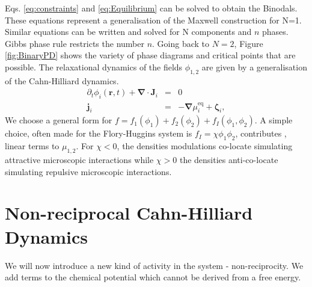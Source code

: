 Eqs. \eqref{eq:constraints} and \eqref{eq:Equilibrium} can be solved to obtain the Binodals. These equations represent a generalisation of the Maxwell construction for N=1. Similar equations can be written and solved for N components and $n$ phases. Gibbs phase rule restricts the number $n$. Going back to $N=2$, Figure \ref{fig:BinaryPD} shows the variety of phase diagrams and critical points that are possible. The relaxational dynamics of the fields $\phi_{1,2}$ are given by a generalisation of the Cahn-Hilliard dynamics. 
\begin{eqnarray}
\partial_t \phi_i(\bm{r},t) + \bm{\nabla} \cdot \bm{J}_i &=& 0 \\
 \bm{j}_i &=& - \bm{\nabla} \mu_{i}^\mathrm{eq}   +  \bm{\zeta}_i,
\end{eqnarray}
We choose a general form for $f  = f_1(\phi_1) + f_2(\phi_2) + f_{I}(\phi_1,\phi_2)$. A simple choice, often made for the Flory-Huggins system is $f_I = \chi \phi_1 \phi_2$, contributes , linear terms to $\mu_{1,2}$. For $\chi <0$, the densities modulations co-locate simulating attractive microscopic interactions while $\chi>0$ the densities anti-co-locate simulating repulsive microscopic interactions.

\section{Non-reciprocal Cahn-Hilliard Dynamics}
We will now introduce a new kind of activity in the system - non-reciprocity. We add terms to the chemical potential which cannot be derived from a free energy.  

